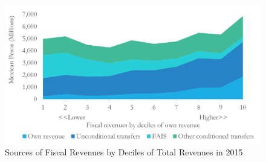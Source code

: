 \documentclass[dv_diss_main.tex]{subfiles}
\begin{document}
\begin{figure}[H] 
	\centering 
	
	\includegraphics[width=\linewidth]{figures/Descriptives_2.png}
	\caption{Sources of Fiscal Revenues by Deciles of Total Revenues in 2015}\label{fig:des4}

\parbox{\textwidth}{\small 
	\vspace{2eX}
	\scriptsize	
	\revenuebydecil 
}
	
\end{figure}
\end{document}
